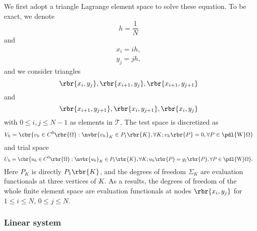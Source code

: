 \documentclass[english, nochinese]{pnote}
\begin{document}
We first adopt a triangle Lagrange element space to solve these equation. To be exact, we denote
\begin{equation}
h = \frac{1}{N}
\end{equation}
and
\begin{gather}
x_i = i h, \\
y_j = j h,
\end{gather}
and we consider triangles
\begin{equation}
\rbr{ x_i, y_j }, \rbr{ x_{ i + 1 }, y_j }, \rbr{ x_{ i + 1 }, y_{ j + 1 } }
\end{equation}
and
\begin{equation}
\rbr{ x_{ i + 1 }, y_{ j + 1 } }, \rbr{ x_i, y_{ j + 1 } }, \rbr{ x_i, y_j }
\end{equation}
with $ 0 \le i, j \le N - 1 $ as elements in $\mathcal{T}$. The test space is discretized as
\begin{equation}
V_h = \cbr{ v_h \in C^0 \rbr{\Omega} : \nvbr{v_h}_K \in P_1 \rbr{K}, \forall K; v_h \rbr{P} = 0, \forall P \in \pdl{\text{W}} \Omega }
\end{equation}
and trial space
\begin{equation}
U_h = \cbr{ u_h \in C^0 \rbr{\Omega} : \nvbr{u_h}_K \in P_1 \rbr{K}, \forall K; u_h \rbr{P} = g_1 \rbr{P}, \forall P \in \pdl{\text{W}} \Omega }.
\end{equation}
Here $P_K$ is directly $ P_1 \rbr{K} $, and the degrees of freedom $\Sigma_K$ are evaluation functionals at three vertices of $K$. As a results, the degrees of freedom of the whole finite element space are evaluation functionals at nodes $ \rbr{ x_i, y_j } $ for $ 1 \le i \le N $, $ 0 \le j \le N $.

\subsubsection{Linear system}
\end{document}
